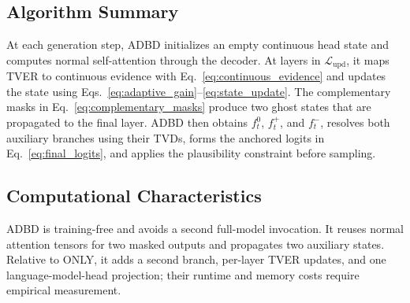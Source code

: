 \subsection{Algorithm Summary}

At each generation step, ADBD initializes an empty continuous head state and computes normal self-attention through the decoder. At layers in $\mathcal{L}_{\mathrm{upd}}$, it maps TVER to continuous evidence with Eq.~\eqref{eq:continuous_evidence} and updates the state using Eqs.~\eqref{eq:adaptive_gain}--\eqref{eq:state_update}. The complementary masks in Eq.~\eqref{eq:complementary_masks} produce two ghost states that are propagated to the final layer. ADBD then obtains $f_t^{0}$, $f_t^{+}$, and $f_t^{-}$, resolves both auxiliary branches using their TVDs, forms the anchored logits in Eq.~\eqref{eq:final_logits}, and applies the plausibility constraint before sampling.

\subsection{Computational Characteristics}

ADBD is training-free and avoids a second full-model invocation. It reuses normal attention tensors for two masked outputs and propagates two auxiliary states. Relative to ONLY, it adds a second branch, per-layer TVER updates, and one language-model-head projection; their runtime and memory costs require empirical measurement.
